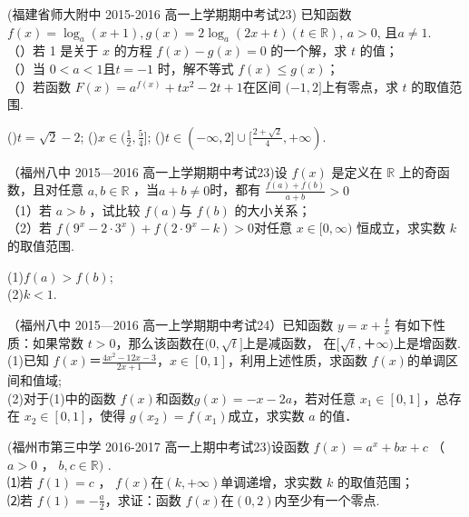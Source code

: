 \item (福建省师大附中 2015-2016 高一上学期期中考试23) 已知函数 $f ( x ) =\log_a ( x+ 1), g ( x )= 2 \log_a ( 2 x+ t )(t\in \mathbb{R})$, $a> 0$, 且$a\neq 1$.\\
（）若 1 是关于 $x$ 的方程 $f ( x) -g ( x) =0$ 的一个解，求 $t$ 的值；\\
（）当 $0< a< 1$且$t=-1$ 时，解不等式 $f ( x)\leq g ( x) $；\\
（）若函数 $F ( x)= a^{f ( x ) }+ tx^2- 2t+ 1 $在区间 $(-1,2]$上有零点，求 $t$ 的取值范围.
\begin{answer}
()$t=\sqrt{2}-2$;
()$x\in(\frac12,\frac54]$;
()$t\in(-\infty,2]\cup [\frac{2+\sqrt{2}}{4},+\infty)$.
\end{answer}

\item
（福州八中 2015—2016 高一上学期期中考试23)设 $f (x )$ 是定义在 $\mathbb{R}$ 上的奇函数，且对任意 $a,b\in \mathbb{R}$ ，当$a+b\neq0$时，都有 $\frac{f(a)+f(b)}{a+b}>0$\\
（1）若 $a> b$ ，试比较 $f (a ) $与 $f (b)$ 的大小关系；\\
（2）若 $f (9^x- 2\cdot 3^x )+ f ( 2\cdot 9^x-k )> 0 $对任意 $x\in[0,\infty )$ 恒成立，求实数 $k$ 的取值范围.
\begin{answer}
(1)$f(a)>f(b)$;\\
(2)$k<1$.\\
\end{answer}

（福州八中 2015—2016 高一上学期期中考试24）已知函数 $y=x+\frac tx$ 有如下性质：如果常数 $t>0$，那么该函数在$(0,\sqrt t]$上是减函数， 在$[\sqrt t, ＋\infty)$上是增函数.\\
(1)已知 $f(x)＝\frac{4x^2-12x-3}{2x+1} $，$x\in[0,1]$，利用上述性质，求函数 $f(x)$的单调区间和值域;\\
(2)对于(1)中的函数 $f(x)$和函数$g(x)=-x-2a$，若对任意 $x_1 \in[0,1]$，总存在 $x_2\in[0,1]$，使得 $g(x_2 )=f(x_1 ) $成立，求实数 $a$ 的值．


(福州市第三中学 2016-2017 高一上期中考试23)设函数 $f (x)=a^x+ bx +c$ （ $a> 0$ ， $b, c\in \mathbb{R})$ . \\
⑴若 $f (1)= c$ ， $f (x)$在$( k,+\infty)$单调递增，求实数 $k$ 的取值范围；\\
 ⑵若 $f( 1)=-\frac a2$，求证：函数 $f (x) $在$( 0,2) $内至少有一个零点.



